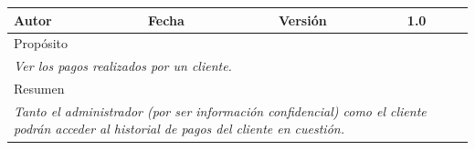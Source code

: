 \begin{table}[H]
\begin{tabular}{|llllllll|}
    \multicolumn{1}{|l|}{Autor}             & \multicolumn{1}{l|}{}                        & \multicolumn{2}{l|}{Fecha}           & \multicolumn{1}{l|}{}     & \multicolumn{2}{l|}{Versión}         & 1.0                           \\ \hline
    \multicolumn{8}{|l|}{\cellcolor[HTML]{F2F2F2}Propósito}                                                                                                                                                                          \\ \hline
    \multicolumn{8}{|p{15cm}|}{{\color[HTML]{808080} \textit{Ver los pagos realizados por un cliente.}}}                                                                                                           \\ \hline
    \multicolumn{8}{|l|}{\cellcolor[HTML]{F2F2F2}Resumen}                                                                                                                                                                            \\ \hline
    \multicolumn{8}{|p{15cm}|}{{\color[HTML]{808080} \textit{Tanto el administrador (por ser información confidencial) como el cliente podrán acceder al historial de pagos del cliente en cuestión.}}} \\ \hline
    \end{tabular}
\end{table}

























